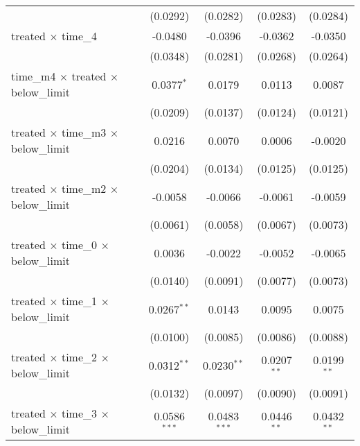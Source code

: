 \begin{tabular}{lcccc}
                                                       & (0.0292)        & (0.0282)        & (0.0283)        & (0.0284)\\   
   treated $\times$ time\_4                            & -0.0480         & -0.0396         & -0.0362         & -0.0350\\   
                                                       & (0.0348)        & (0.0281)        & (0.0268)        & (0.0264)\\   
   time\_m4 $\times$ treated $\times$ below\_limit     & 0.0377$^{*}$    & 0.0179          & 0.0113          & 0.0087\\   
                                                       & (0.0209)        & (0.0137)        & (0.0124)        & (0.0121)\\   
   treated $\times$ time\_m3 $\times$ below\_limit     & 0.0216          & 0.0070          & 0.0006          & -0.0020\\   
                                                       & (0.0204)        & (0.0134)        & (0.0125)        & (0.0125)\\   
   treated $\times$ time\_m2 $\times$ below\_limit     & -0.0058         & -0.0066         & -0.0061         & -0.0059\\   
                                                       & (0.0061)        & (0.0058)        & (0.0067)        & (0.0073)\\   
   treated $\times$ time\_0 $\times$ below\_limit      & 0.0036          & -0.0022         & -0.0052         & -0.0065\\   
                                                       & (0.0140)        & (0.0091)        & (0.0077)        & (0.0073)\\   
   treated $\times$ time\_1 $\times$ below\_limit      & 0.0267$^{**}$   & 0.0143          & 0.0095          & 0.0075\\   
                                                       & (0.0100)        & (0.0085)        & (0.0086)        & (0.0088)\\   
   treated $\times$ time\_2 $\times$ below\_limit      & 0.0312$^{**}$   & 0.0230$^{**}$   & 0.0207$^{**}$   & 0.0199$^{**}$\\   
                                                       & (0.0132)        & (0.0097)        & (0.0090)        & (0.0091)\\   
   treated $\times$ time\_3 $\times$ below\_limit      & 0.0586$^{***}$  & 0.0483$^{***}$  & 0.0446$^{**}$   & 0.0432$^{**}$\\   

\end{tabular}
